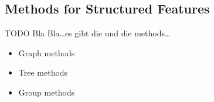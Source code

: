 \subsection{Methods for Structured Features}
\label{sec:methods.structured}


TODO
Bla Bla\ldots es gibt die und die methods\ldots

\begin{itemize}
  \item Graph methods
  \item Tree methods
  \item Group methods
\end{itemize}




